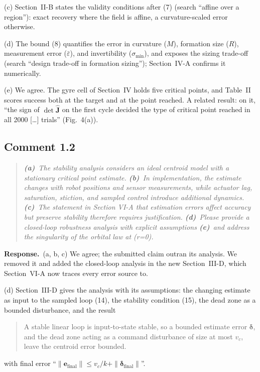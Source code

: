\documentclass[10pt]{article}
\newcommand{\rev}[1]{#1}                             %
\newcommand{\resp}{\par\textbf{Response.}~}
\newenvironment{newtext}{\begin{quote}\small\sloppy}{\end{quote}}
\begin{document}
(c) Section~II-B states the validity conditions after (7) (search ``affine over a region''): exact recovery where the field is affine, a curvature-scaled error otherwise.

(d) The bound (8) quantifies the error in curvature ($M$), formation size ($R$), measurement error ($\bar\varepsilon$), and invertibility ($\sigma_{\min}$), and exposes the sizing trade-off (search ``design trade-off in formation sizing''); Section~IV-A confirms it numerically.

(e) We agree. The gyre cell of Section~IV holds five critical points, and Table~II scores success both at the target and at the point reached. A related result: on it, ``the sign of $\det\hat{\mathbf{J}}$ on the first cycle decided the type of critical point reached in all \rev{2000} [\ldots] trials'' (Fig.~4(a)).

\subsection*{Comment 1.2}

\begin{quote}\itshape
\textbf{(a)}~The stability analysis considers an ideal centroid model with a stationary critical point estimate.
\textbf{(b)}~In implementation, the estimate changes with robot positions and sensor measurements, while actuator lag, saturation, stiction, and sampled control introduce additional dynamics.
\textbf{(c)}~The statement in Section VI-A that estimation errors affect accuracy but preserve stability therefore requires justification.
\textbf{(d)}~Please provide a closed-loop robustness analysis with explicit assumptions
\textbf{(e)}~and address the singularity of the orbital law at (r=0).
\end{quote}

\resp (a, b, c) We agree; the submitted claim outran its analysis. We removed it and added the closed-loop analysis in the new Section~III-D, which Section~VI-A now traces every error source to.

(d) Section~III-D gives the analysis with its assumptions: the changing estimate as input to the sampled loop (14), the stability condition (15), the dead zone as a bounded disturbance, and the result
\begin{newtext}
A stable linear loop is input-to-state stable, so a bounded estimate error $\boldsymbol{\delta}$, and the dead zone acting as a command disturbance of size at most $v_c$, leave the centroid error bounded.
\end{newtext}
with final error ``$\|\mathbf{e}_{\text{final}}\| \le v_c/k + \|\boldsymbol{\delta}_{\text{final}}\|$''.
\end{document}
